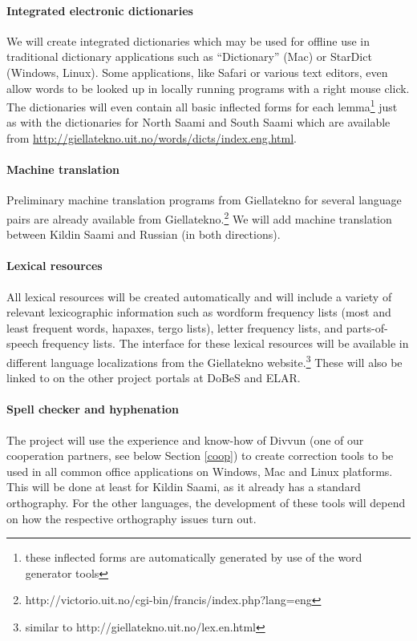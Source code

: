 \documentclass[a4paper,12pt]{article}
\begin{document}
\paragraph{Integrated electronic dictionaries}
We will create integrated dictionaries which may be used for offline use in traditional dictionary applications such as “Dictionary” (Mac) or StarDict (Windows, Linux). Some applications, like Safari or various text editors, even allow words to be looked up in locally running programs with a right mouse click. The dictionaries will even contain all basic inflected forms for each lemma\footnote{these inflected forms are automatically generated by use of the word generator tools} just as with the dictionaries for North Saami and South Saami which are available from \url{http://giellatekno.uit.no/words/dicts/index.eng.html}.

\paragraph{Machine translation}
Preliminary machine translation programs from Giellatekno for several language pairs are already available from Giellatekno.\footnote{http://victorio.uit.no/cgi-bin/francis/index.php?lang=eng} We will add machine translation between Kildin Saami and Russian (in both directions).

\paragraph{Lexical resources}
All lexical resources will be created automatically and will include a variety of relevant lexicographic information such as wordform frequency lists (most and least frequent words, hapaxes, tergo lists), letter frequency lists, and parts-of-speech frequency lists. The interface for these lexical resources will be available in different language localizations from the Giellatekno website.\footnote{similar to http://giellatekno.uit.no/lex.en.html} These will also be linked to on the other project portals at DoBeS and ELAR.

\paragraph{Spell checker and hyphenation} 
The project will use the experience and know-how of Divvun (one of our cooperation partners, see below Section \ref{coop}) to create correction tools to be used in all common office applications on Windows, Mac and Linux platforms. This will be done at least for Kildin Saami, as it already has a standard orthography. For the other languages, the development of these tools will depend on how the respective orthography issues turn out.
\end{document}
